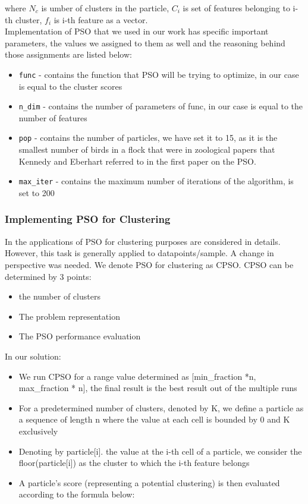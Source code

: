 \documentclass[conference]{IEEEtran}
\begin{document}
where $N_c$ is umber of clusters in the particle, $C_i$ is set of features belonging to i-th cluster, $f_i$ is i-th feature as a vector.\\

Implementation of PSO that we used in our work has specific important parameters, the values we assigned to them as well and the reasoning behind those assignments are listed below:
\begin{itemize}
	\item \texttt{func} - contains the function that PSO will be trying to optimize, in our case is equal to the cluster scores
	\item \texttt{n\_dim} - contains the number of parameters of func, in our case is equal to the number of features
	\item \texttt{pop} - contains the number of particles, we have set it to 15, as it is the smallest number of birds in a flock that were in zoological papers that Kennedy and Eberhart referred to in the first paper on the PSO\cite{piotrowski2020population}.
	\item \texttt{max\_iter} - contains the maximum number of iterations of the algorithm, is set to 200
	
\end{itemize}

\subsubsection{Implementing PSO for Clustering}

In \cite{ballardini2018tutorial} the applications of PSO for clustering purposes are considered in details. However, this task is generally applied to datapoints/sample. A change in perspective was needed. We denote PSO for clustering as CPSO. CPSO can be determined by 3 points:

\begin{itemize}
	\item the number of clusters
	\item The problem representation
	\item The PSO performance evaluation
\end{itemize}

In our solution:

\begin{itemize}
	\item We run CPSO for a range value determined as [min\_fraction *n, max\_fraction * n], the final result is the best result out of the multiple runs 
	\item For a predetermined number of clusters, denoted by K, we define a particle as a sequence of length n where the value at each cell is bounded by 0 and K exclusively
	\item Denoting by particle[i].  the value at the i-th cell of a particle, we consider the floor(particle[i]) as the cluster to which the i-th feature belongs
	\item A particle's score (representing a potential clustering) is then evaluated according to the formula below:
\end{itemize}
\end{document}
